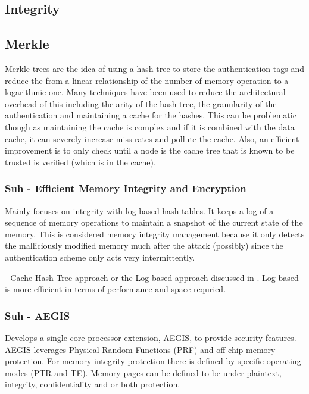 \subsection{Integrity}
\subsection{Merkle}
Merkle trees \cite{merkle} are the idea of using a hash tree to store the
authentication tags and reduce the  from a linear
relationship of the number of memory operation to a logarithmic one. Many
techniques have been used to reduce the architectural overhead of this
including the arity of the hash tree, the granularity of the authentication and
maintaining a cache for the hashes. This can be problematic though as
maintaining the cache is complex and if it is combined with the data cache, it
can severely increase miss rates and pollute the cache. Also, an efficient
improvement is to only check until a node is the cache tree that is known to be
trusted is verified (which is in the cache).

\subsubsection{Suh - Efficient Memory Integrity and Encryption}
Mainly focuses on integrity with log based hash tables. It keeps a log of a
sequence of memory operations to maintain a snapshot of the current state of
the memory. This is considered  memory integrity management because it
only detects the malliciously modified memory much after the attack (possibly)
since the authentication scheme only acts very intermittently.

 - Cache Hash Tree approach or the Log based
  approach discussed in \cite{suh-memIntEnc}. Log based is more efficient in
  terms of performance and space requried.

\subsubsection{Suh - AEGIS}
Develops a single-core processor extension, AEGIS, \cite{aegis} to provide
security features. AEGIS leverages Physical Random Functions (PRF) and off-chip
memory protection. For memory integrity protection there is defined by specific
operating modes (PTR and TE). Memory pages can be defined to be under
plaintext, integrity, confidentiality and or both protection.

